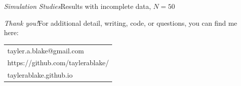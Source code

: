 \begin{frame}[c]{\emph{Simulation Studies}}{Results with incomplete data, $N = 50$}
\centering

\end{frame}

\begin{frame}{\emph{Thank you!}}{For additional detail, writing, code, or questions, you can find me here:} 
\begin{tabular}{l}
tayler.a.blake@gmail.com \\
https://github.com/taylerablake/ \\
taylerablake.github.io
\end{tabular}
\end{frame}



